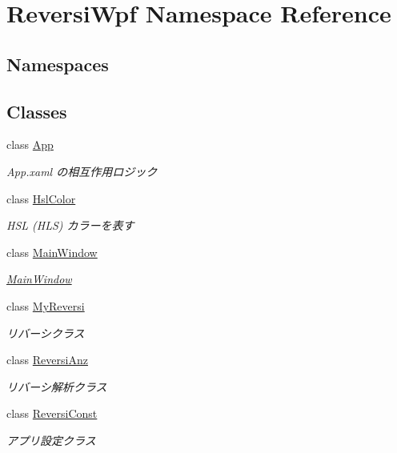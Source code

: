 \hypertarget{namespace_reversi_wpf}{}\section{Reversi\+Wpf Namespace Reference}
\label{namespace_reversi_wpf}
\subsection*{Namespaces}
\begin{DoxyCompactItemize}
\end{DoxyCompactItemize}
\subsection*{Classes}
\begin{DoxyCompactItemize}
\item 
class \hyperlink{class_reversi_wpf_1_1_app}{App}
\begin{DoxyCompactList}\small\item\em App.\+xaml の相互作用ロジック \end{DoxyCompactList}\item 
class \hyperlink{class_reversi_wpf_1_1_hsl_color}{Hsl\+Color}
\begin{DoxyCompactList}\small\item\em H\+SL (H\+LS) カラーを表す \end{DoxyCompactList}\item 
class \hyperlink{class_reversi_wpf_1_1_main_window}{Main\+Window}
\begin{DoxyCompactList}\small\item\em \hyperlink{class_reversi_wpf_1_1_main_window}{Main\+Window} \end{DoxyCompactList}\item 
class \hyperlink{class_reversi_wpf_1_1_my_reversi}{My\+Reversi}
\begin{DoxyCompactList}\small\item\em リバーシクラス \end{DoxyCompactList}\item 
class \hyperlink{class_reversi_wpf_1_1_reversi_anz}{Reversi\+Anz}
\begin{DoxyCompactList}\small\item\em リバーシ解析クラス \end{DoxyCompactList}\item 
class \hyperlink{class_reversi_wpf_1_1_reversi_const}{Reversi\+Const}
\begin{DoxyCompactList}\small\item\em アプリ設定クラス \end{DoxyCompactList}\item 

\end{DoxyCompactItemize}
